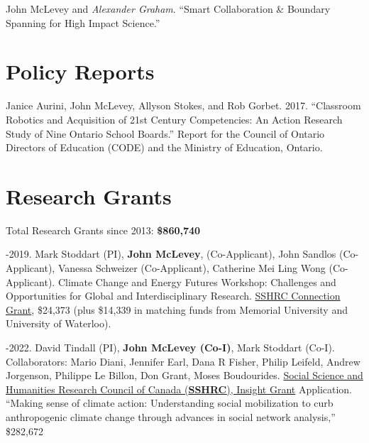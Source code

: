 \ind John McLevey and \emph{Alexander Graham}. ``Smart Collaboration \&
Boundary Spanning for High Impact Science.''

\section{Policy Reports}\label{policy-reports}

\ind Janice Aurini, John McLevey, Allyson Stokes, and Rob Gorbet. 2017.
``Classroom Robotics and Acquisition of 21st Century Competencies: An
Action Research Study of Nine Ontario School Boards.'' Report for the
Council of Ontario Directors of Education (CODE) and the Ministry of
Education, Ontario.

\section{Research Grants}\label{research-grants}

\ind Total Research Grants since 2013: \textbf{\$860,740} \bigskip

-2019. Mark Stoddart (PI), \textbf{John McLevey},
(Co-Applicant), John Sandlos (Co-Applicant), Vanessa Schweizer
(Co-Applicant), Catherine Mei Ling Wong (Co-Applicant). Climate Change
and Energy Futures Workshop: Challenges and Opportunities for Global and
Interdisciplinary Research.
\href{http://www.sshrc-crsh.gc.ca/funding-financement/programs-programmes/connection_grants-subventions_connexion-eng.aspx}{SSHRC
Connection Grant}, \$24,373 (plus \$14,339 in matching funds from
Memorial University and University of Waterloo).

-2022. David Tindall (PI), \textbf{John McLevey (Co-I)}, Mark
Stoddart (Co-I). Collaborators: Mario Diani, Jennifer Earl, Dana R
Fisher, Philip Leifeld, Andrew Jorgenson, Philippe Le Billon, Don Grant,
Moses Boudourides.
\href{http://www.sshrc-crsh.gc.ca/funding-financement/programs-programmes/insight_grants-subventions_savoir-eng.aspx}{Social
Science and Humanities Research Council of Canada (\textbf{SSHRC}),
Insight Grant} Application. ``Making sense of climate action:
Understanding social mobilization to curb anthropogenic climate change
through advances in social network analysis,'' \$282,672


